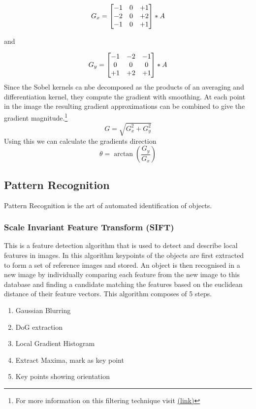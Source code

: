 \[\centering
G_x = \begin{bmatrix} 
    -1&0&+1\\
    -2&0&+2\\
    -1&0&+1\\
    \end{bmatrix}
    * A
\]
\begin{center}
    and
\end{center}
\[ \centering
 G_y = \begin{bmatrix} 
    -1&-2&-1\\
    0&0&0\\
    +1&+2&+1\\
    \end{bmatrix}
    * A
\]
Since the Sobel kernels ca nbe decomposed as the products of an averaging and differentiation kernel, they compute the gradient with smoothing. At each point in the image the resulting gradient approximations can be combined to give the gradient magnitude.\footnote{For more information on this filtering technique visit \href{https://www.tutorialspoint.com/dip/sobel_operator.htm}{(link)}}
\[
G = \sqrt{G_x^2 + G_y^2}
\]
Using this we can calculate the gradients direction
\[
\theta = \arctan(\frac{G_y}{G_x})
\]
\subsection{Pattern Recognition}
Pattern Recognition is the art of automated identification of objects. 
\subsubsection{Scale Invariant Feature Transform (SIFT)}
This is a feature detection algorithm that is used to detect and describe local features in images. In this algorithm keypoints of the objects are first extracted to form a set of reference images and stored. An object is then recognised in a new image by individually comparing each feature from the new image to this database and finding a candidate matching the features based on the euclidean distance of their feature vectors. This algorithm composes of 5 steps.
\begin{enumerate}
    \item Gaussian Blurring
    \item DoG extraction
    \item Local Gradient Histogram
    \item Extract Maxima, mark as key point
    \item Key points showing orientation
\end{enumerate}
